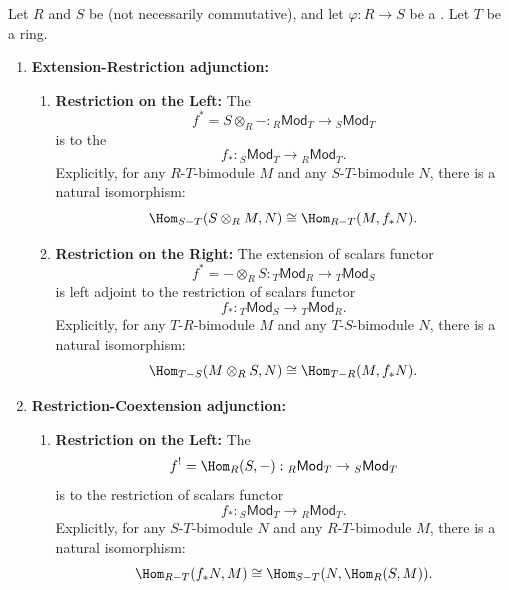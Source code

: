 \begin{theorem} \label{theorem:extension_restriction_and_restriction_coextension_adjunction_for_modules_over_rings}
Let $R$ and $S$ be  (not necessarily commutative), and let $\varphi : R \to S$ be a . Let $T$ be a ring.

\begin{enumerate}
    \item \textbf{Extension-Restriction adjunction:}
    \begin{enumerate}
        \item \textbf{Restriction on the Left:} The 
        \[ f^* = S \otimes_R - : {}_R\mathsf{Mod}_T \to {}_S\mathsf{Mod}_T \]
        is  to the 
        \[ f_* : {}_S\mathsf{Mod}_T \to {}_R\mathsf{Mod}_T. \]
        Explicitly, for any $R$-$T$-bimodule $M$ and any $S$-$T$-bimodule $N$, there is a natural isomorphism:
        \[
            \Hom_{S-T}(S \otimes_R M, N) \cong \Hom_{R-T}(M, f_*N).
        \]

        \item \textbf{Restriction on the Right:} The extension of scalars functor
        \[ f^* = - \otimes_R S : {}_T\mathsf{Mod}_R \to {}_T\mathsf{Mod}_S \]
        is left adjoint to the restriction of scalars functor
        \[ f_* : {}_T\mathsf{Mod}_S \to {}_T\mathsf{Mod}_R. \]
        Explicitly, for any $T$-$R$-bimodule $M$ and any $T$-$S$-bimodule $N$, there is a natural isomorphism:
        \[
            \Hom_{T-S}(M \otimes_R S, N) \cong \Hom_{T-R}(M, f_*N).
        \]
    \end{enumerate}

    \item \textbf{Restriction-Coextension adjunction:}
    \begin{enumerate}
        \item \textbf{Restriction on the Left:} The 
        \[ f^! = \Hom_R(S, -) : {}_R\mathsf{Mod}_T \to {}_S\mathsf{Mod}_T \]
        is  to the restriction of scalars functor
        \[ f_* : {}_S\mathsf{Mod}_T \to {}_R\mathsf{Mod}_T. \]
        Explicitly, for any $S$-$T$-bimodule $N$ and any $R$-$T$-bimodule $M$, there is a natural isomorphism:
        \[ \Hom_{R-T}(f_*N, M) \cong \Hom_{S-T}(N, \Hom_R(S, M)). \]


\end{enumerate}
\end{enumerate}
\end{theorem}
